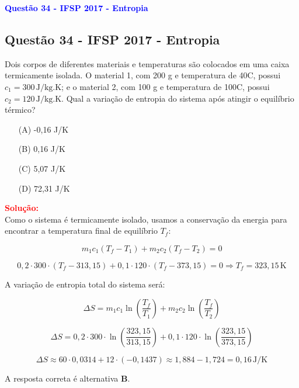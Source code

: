 \begin{flushleft}
\textbf{\textcolor{blue}{\Large Quest\~ao 34 - IFSP 2017 - Entropia}}\\
\noindent

\subsection{Quest\~ao 34 - IFSP 2017 - Entropia}
Dois corpos de diferentes materiais e temperaturas s\~ao colocados em uma caixa termicamente isolada. 
O material 1, com 200 g e temperatura de 40\textdegree C, possui $c_1 = 300 \, \text{J/kg.K}$; e o material 2, 
com 100 g e temperatura de 100\textdegree C, possui $c_2 = 120 \, \text{J/kg.K}$. Qual a varia\c{c}\~ao de entropia do 
sistema ap\'os atingir o equil\'ibrio t\'ermico?

\begin{itemize}
\item[(A)] -0,16 J/K
\item[(B)] 0,16 J/K
\item[(C)] 5,07 J/K
\item[(D)] 72,31 J/K
\end{itemize}

\vspace{0.5cm}

\textcolor{red}{\textbf{Solução:}}\\

Como o sistema é termicamente isolado, usamos a conserva\c{c}\~ao da energia para encontrar a temperatura final de equil\'ibrio $T_f$:

\[
m_1 c_1 (T_f - T_1) + m_2 c_2 (T_f - T_2) = 0
\]

\[
0{,}2 \cdot 300 \cdot (T_f - 313{,}15) + 0{,}1 \cdot 120 \cdot (T_f - 373{,}15) = 0
\Rightarrow T_f = 323{,}15\, \text{K}
\]

A varia\c{c}\~ao de entropia total do sistema ser\'a:

\[
\Delta S = m_1 c_1 \ln \left( \frac{T_f}{T_1} \right) + m_2 c_2 \ln \left( \frac{T_f}{T_2} \right)
\]

\[
\Delta S = 0{,}2 \cdot 300 \cdot \ln\left( \frac{323{,}15}{313{,}15} \right) + 0{,}1 \cdot 120 \cdot \ln\left( \frac{323{,}15}{373{,}15} \right)
\]

\[
\Delta S \approx 60 \cdot 0{,}0314 + 12 \cdot (-0{,}1437) \approx 1{,}884 - 1{,}724 = \boxed{0{,}16 \, \text{J/K}}
\]

A resposta correta é alternativa \colorbox{green!50}{\textbf{B}}.

\end{flushleft}

